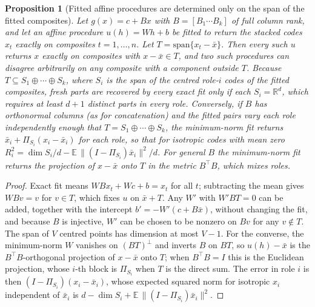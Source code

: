 \documentclass[10pt]{article}
\theoremstyle{plain}
\newtheorem{proposition}{Proposition}
\theoremstyle{remark}
\newcommand{\R}{\mathbb{R}}
\begin{document}
\begin{proposition}[Fitted affine procedures are determined only on the span of the fitted composites]
\label{prop:span}
Let $g(x) = c + Bx$ with $B = [B_1 \cdots B_k]$ of full column rank, and let an affine procedure $u(h) = Wh + b$ be fitted to return the stacked codes $x_t$ exactly on composites $t = 1, \ldots, n$. Let $T = \mathrm{span}\{x_t - \bar{x}\}$. Then every such $u$ returns $x$ exactly on composites with $x - \bar{x} \in T$, and two such procedures can disagree arbitrarily on any composite with a component outside $T$. Because $T \subseteq S_1 \oplus \cdots \oplus S_k$, where $S_i$ is the span of the centred role-$i$ codes of the fitted composites, fresh parts are recovered by every exact fit only if each $S_i = \R^d$, which requires at least $d + 1$ distinct parts in every role. Conversely, if $B$ has orthonormal columns (as for concatenation) and the fitted pairs vary each role independently enough that $T = S_1 \oplus \cdots \oplus S_k$, the minimum-norm fit returns $\bar{x}_i + \Pi_{S_i}(x_i - \bar{x}_i)$ for each role, so that for isotropic codes with mean zero $R^2_i = \dim S_i/d - \mathbb{E}\,\lVert (I - \Pi_{S_i})\bar{x}_i \rVert^2/d$. For general $B$ the minimum-norm fit returns the projection of $x - \bar{x}$ onto $T$ in the metric $B^{\top}B$, which mixes roles.
\end{proposition}

\begin{proof}
Exact fit means $WBx_t + Wc + b = x_t$ for all $t$; subtracting the mean gives $WBv = v$ for $v \in T$, which fixes $u$ on $\bar{x} + T$. Any $W'$ with $W'BT = 0$ can be added, together with the intercept $b' = -W'(c + B\bar{x})$, without changing the fit, and because $B$ is injective, $W'$ can be chosen to be nonzero on $B v$ for any $v \notin T$. The span of $V$ centred points has dimension at most $V - 1$. For the converse, the minimum-norm $W$ vanishes on $(BT)^{\perp}$ and inverts $B$ on $BT$, so $u(h) - \bar{x}$ is the $B^{\top}B$-orthogonal projection of $x - \bar{x}$ onto $T$; when $B^{\top}B = I$ this is the Euclidean projection, whose $i$-th block is $\Pi_{S_i}$ when $T$ is the direct sum. The error in role $i$ is then $(I - \Pi_{S_i})(x_i - \bar{x}_i)$, whose expected squared norm for isotropic $x_i$ independent of $\bar{x}_i$ is $d - \dim S_i + \mathbb{E}\,\lVert (I - \Pi_{S_i})\bar{x}_i \rVert^2$.
\end{proof}
\end{document}
